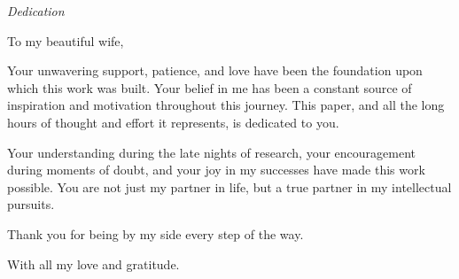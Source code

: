 
\begin{dedication}
    \thispagestyle{empty}
    \vspace*{\fill}
    \begin{center}
    
    \Large\textit{Dedication}
    
    \vspace{1cm}
    
    To my beautiful wife,
    
    \vspace{0.5cm}
    
    Your unwavering support, patience, and love have been the foundation upon which this work was built. Your belief in me has been a constant source of inspiration and motivation throughout this journey. This paper, and all the long hours of thought and effort it represents, is dedicated to you.
    
    Your understanding during the late nights of research, your encouragement during moments of doubt, and your joy in my successes have made this work possible. You are not just my partner in life, but a true partner in my intellectual pursuits.
    
    Thank you for being by my side every step of the way.
    
    With all my love and gratitude.
    
    \end{center}
    \vspace*{\fill}
    \end{dedication}